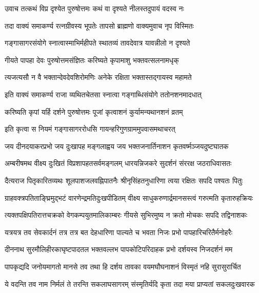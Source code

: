 \twolineshloka
{उवाच तत्कथं विप्र दृश्येत पुरुषोत्तमः}
{कथं वा दृश्यते नीलस्तदुपायं वदस्व नः}%

\twolineshloka
{तदा वाक्यं समाकर्ण्य रत्नग्रीवस्य भूपतेः}
{तापसो ब्राह्मणो वाक्यमुवाच नृप विस्मितः}%

\twolineshloka
{गङ्गासागरसंयोगे स्नात्वास्माभिर्महीपते}
{स्थातव्यं तावदेवात्र यावन्नीलो न दृश्यते}%

\twolineshloka
{गीयते पापहा देवः पुरुषोत्तमसंज्ञितः}
{करिष्यते कृपामाशु भक्तवत्सलनामधृक्}%

\twolineshloka
{त्यजत्यसौ न वै भक्तान्देवदेवशिरोमणिः}
{अनेके रक्षिता भक्तास्तद्गायस्व महामते}%

\twolineshloka
{इति वाक्यं समाकर्ण्य राजा व्यथितचेतसा}
{स्नात्वा गङ्गाब्धिसंयोगे ततोनशनमादधात्}%

\twolineshloka
{करिष्यति कृपां यर्हि दर्शने पुरुषोत्तमः}
{पूजां कृत्वाशनं कुर्यामन्यथानशनं व्रतम्}%

\twolineshloka
{इति कृत्वा स नियमं गङ्गासागररोधसि}
{गायन्हरिगुणग्राममुपवासमथाचरत्}%


\twolineshloka
{जय दीनदयाकरप्रभो जय दुःखापह मङ्गलाह्वय}
{जय भक्तजनार्तिनाशन कृतवर्ष्मञ्जयदुष्टघातक}%

\twolineshloka
{अम्बरीषमथ वीक्ष्य दुःखितं विप्रशापहतसर्वमङ्गलम्}
{धारयन्निजकरे सुदर्शनं संररक्ष जठराधिवासतः}%

\twolineshloka
{दैत्यराज पितृकारितव्यथः शूलपाशजलवह्निपातनैः}
{श्रीनृसिंहतनुधारिणा त्वया रक्षितः सपदि पश्यतः पितुः}%

\twolineshloka
{ग्राहवक्त्रपतिताङ्घ्रिमुद्भटं वारणेन्द्रमतिदुःखपीडितम्}
{वीक्ष्य साधुकरुणार्द्रमानसस्त्वं गरुत्मति कृतारुहक्रियः}%

\twolineshloka
{त्यक्तपक्षिपतिरात्तचक्रको वेगकम्पयुतमालिकाम्बरः}
{गीयसे सुभिरमुष्य न क्रतो मोचकः सपदि तद्विनाशकः}%

\twolineshloka
{यत्रयत्र तव सेवकार्दनं तत्र तत्र बत देहधारिणा}
{पाल्यते च भवता निजः प्रभो पापहारिचरितैर्मनोहरैः}%

\twolineshloka
{दीननाथ सुरमौलिहीरकाघृष्टपादतल भक्तवल्लभ}
{पापकोटिपरिदाहक प्रभो दर्शयस्व निजदर्शनं मम}%

\twolineshloka
{पापकृद्यदि जनोयमागतो मानसे तव तथा हि दर्शय}
{तावका वयमघौघनाशनं विस्मृतं नहि सुरासुरार्चित}%

\twolineshloka
{ये वदन्ति तव नाम निर्मलं ते तरन्ति सकलाघसागरम्}
{संस्मृतिर्यदि कृता तदा मया प्राप्यतां सकलदुःखवारक}%


